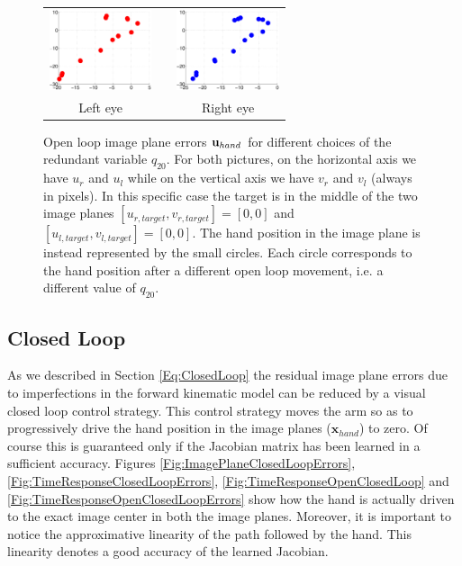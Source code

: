 \begin{figure}
  \begin{center}
	\begin{tabular}{ccc}
	  \parbox{30mm}{\includegraphics[width=30mm]{Figure/LeftEyeOpenLoop.eps}}  & \hspace{0.1cm} &
	  \parbox{30mm}{\includegraphics[width=30mm]{Figure/RightEyeOpenLoop.eps}}
	  \\
	  \parbox{30mm}{\centering Left eye } & \hspace{0.1cm} & \parbox{30mm}{\centering Right eye }
  \end{tabular}
\end{center}
\caption{Open loop image plane errors $\mathbf{u}_{hand}$ for different
choices of the redundant variable $q_{20}$. For both pictures, on the horizontal axis 
we have $u_r$ and $u_l$ while on the vertical axis we have $v_r$ and $v_l$ (always in pixels).
In this specific case the target is in the middle of the two image planes 
$[u_{r, target}, v_{r, target}] =[0,0]$ and $[u_{l, target}, v_{l, target}]=[0,0]$.
The hand position in the image plane is instead represented 
by the small circles.  Each circle corresponds to the hand position 
after a different open loop movement, i.e. a different value of $q_{20}$.
}\label{Fig:ImagePlaneOpenLoopErrors}
  \end{figure}

\subsection{Closed Loop}

As we described in Section \ref{Eq:ClosedLoop} the residual image plane errors 
due to imperfections in the forward kinematic model can be reduced by a visual closed loop
control strategy. This control strategy moves the arm so as to progressively 
drive the hand position in the image planes ($\mathbf x_{hand}$) to zero. Of course this is guaranteed 
only if the  Jacobian matrix has been learned in a sufficient accuracy. Figures 
\ref{Fig:ImagePlaneClosedLoopErrors}, \ref{Fig:TimeResponseClosedLoopErrors},  \ref{Fig:TimeResponseOpenClosedLoop} and \ref{Fig:TimeResponseOpenClosedLoopErrors} 
show how the hand is actually driven to the 
exact image center in both the image planes. Moreover, it is important to notice the
approximative linearity of the path followed by the hand. This linearity denotes 
a good accuracy of the learned Jacobian.

